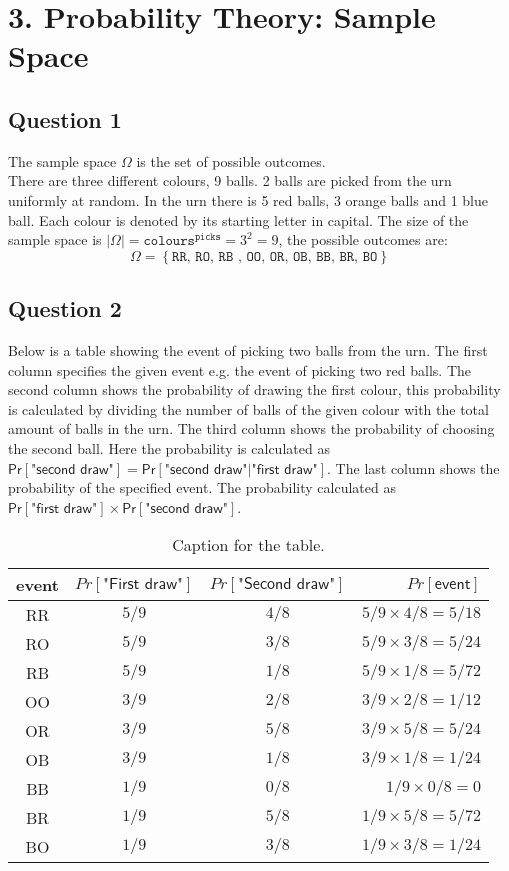 \documentclass{article}
\begin{document}
\section{3. Probability Theory: Sample Space}
\subsection{Question 1}
The sample space $\Omega$ is the set of possible outcomes. \\
There are three different colours, 9 balls. 2  balls are picked from the urn uniformly at random. In the urn there is 5 red balls, 3 orange balls and 1 blue ball. Each colour is denoted by its starting letter in capital. The size of the sample space is $|\Omega| = \texttt{colours}^{\texttt{picks}} = 3^2 = 9$, the possible outcomes are:
$$ \Omega = \left\lbrace \texttt{RR, RO, RB , OO, OR, OB, BB, BR, BO} \right\rbrace $$
\subsection{Question 2}
Below is a table showing the event of picking two balls from the urn. The first column specifies the given event e.g. the event of picking two red balls. The second column shows the probability of drawing the first colour, this probability is calculated by dividing the number of balls of the given colour with the total amount of balls in the urn. The third column shows the probability of choosing the second ball. Here the probability is calculated as 
$ \textsf{Pr}[\textsf{"second draw"}] = \textsf{Pr}[\textsf{"second draw"} \vert \textsf{"first draw"}]$.  The last column shows the probability of the specified event. The probability  calculated as $ \textsf{Pr}[\textsf{"first draw"}] \times \textsf{Pr}[\textsf{"second draw"}]$.
\begin{table}[H]
  \centering
  \caption{Caption for the table.}
  \label{tab:table1}
  \begin{tabular}{c|c|c||r}
    \textsf{event} & $Pr[\textsf{"First draw"}]$ & $Pr[\textsf{"Second draw"}]$ & $Pr[\textsf{event}]$ \\
    \hline
    RR & $5/9$ & $4/8$ &  $ 5/9 \times 4/8 = 5/18$\\
    RO & $5/9$ & $3/8$ &  $ 5/9 \times 3/8 = 5/24$\\
    RB & $5/9$ & $1/8$ &  $ 5/9 \times 1/8 = 5/72$\\
    OO & $3/9$ & $2/8$ &  $ 3/9 \times 2/8 = 1/12$\\
    OR & $3/9$ & $5/8$ &  $ 3/9 \times 5/8 = 5/24$\\
    OB & $3/9$ & $1/8$ &  $ 3/9 \times 1/8 = 1/24$\\
    BB & $1/9$ & $0/8$ &  $ 1/9 \times 0/8 = 0$\\
    BR & $1/9$ & $5/8$ &  $ 1/9 \times 5/8 = 5/72$\\
    BO & $1/9$ & $3/8$ &  $ 1/9 \times 3/8 = 1/24$\\
  \end{tabular}
\end{table}
\end{document}
